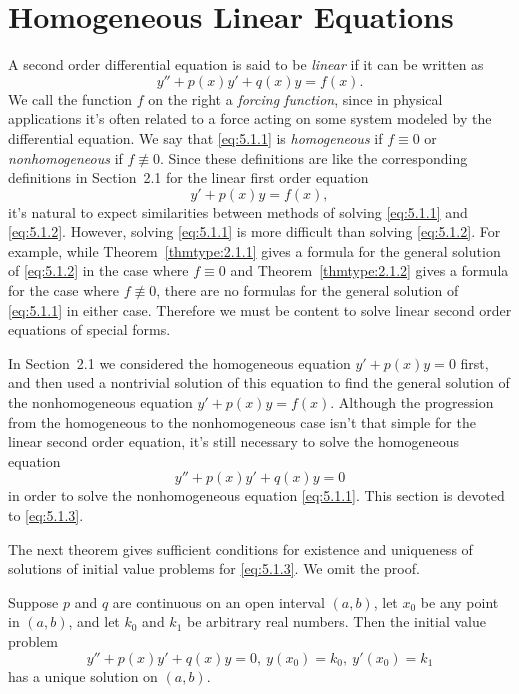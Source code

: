 \section{Homogeneous Linear Equations}

\noindent
A second order differential equation is said to be {\color{blue}\it linear\/} if it can be written
as
\begin{equation}
  \label{eq:5.1.1}y''+p(x)y'+q(x)y=f(x).
\end{equation}
We call the function $f$ on the right a {\color{blue}\it forcing function\/}, since in physical
applications it's often related to a force acting on some system modeled by the differential
equation. We say that \eqref{eq:5.1.1} is {\color{blue}\it homogeneous\/} if $f\equiv0$ or
{\color{blue}\it nonhomogeneous\/} if $f\not\equiv0$. Since these definitions are like the
corresponding definitions in Section~2.1 for the linear first order equation
\begin{equation}
  \label{eq:5.1.2}y'+p(x)y=f(x),
\end{equation}
it's natural to expect similarities between methods of solving \eqref{eq:5.1.1} and
\eqref{eq:5.1.2}. However, solving \eqref{eq:5.1.1} is more difficult than solving \eqref{eq:5.1.2}.
For example, while Theorem~\ref{thmtype:2.1.1} gives a formula for the general solution of
\eqref{eq:5.1.2} in the case where $f\equiv0$ and Theorem~\ref{thmtype:2.1.2} gives a formula for
the case where $f\not\equiv0$, there are no formulas for the general solution of \eqref{eq:5.1.1} in
either case. Therefore we must be content to solve linear second order equations of special forms.

In Section~2.1 we considered the homogeneous equation $y'+p(x)y=0$ first, and then used a nontrivial
solution of this equation to find the general solution of the nonhomogeneous equation
$y'+p(x)y=f(x)$. Although the progression from the homogeneous to the nonhomogeneous case isn't that
simple for the linear second order equation, it's still necessary to solve the homogeneous equation
\begin{equation}
  \label{eq:5.1.3}y''+p(x)y'+q(x)y=0
\end{equation}
in order to solve the nonhomogeneous equation \eqref{eq:5.1.1}. This section is devoted to
\eqref{eq:5.1.3}.

The next theorem gives sufficient conditions for existence and uniqueness of solutions of initial
value problems for \eqref{eq:5.1.3}. We omit the proof.

\begin{theorem}
  \color{blue}
  \label{thmtype:5.1.1} Suppose $p$ and $q$ are continuous on an open interval $(a,b)$, let $x_{0}$
  be any point in $(a,b)$, and let $k_{0}$ and $k_{1}$ be arbitrary real numbers. Then the initial
  value problem
  \[
    y''+p(x)y'+q(x)y=0,\ y(x_{0})=k_{0},\ y'(x_{0})=k_{1}
  \]
  has a unique solution on $(a,b)$.
\end{theorem}

